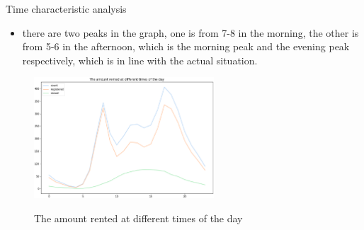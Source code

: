 \documentclass[
 size=14pt,
 paper=smartboard,  %
 mode=present, 		%
 display=slides, 	%
 style=tuliplab,  	%
 pauseslide,
 fleqn,leqno]{powerdot}
\begin{document}
\begin{slide}{Time characteristic analysis}

\begin{itemize}
\item
there are two peaks in the graph, one is from 7-8 in the morning, 
the other is from 5-6 in the afternoon, which is the morning peak 
and the evening peak respectively, which is in line with the actual situation. 
\end{itemize} 
\vspace{-0.8cm} 
\begin{figure}
  \centering
  \includegraphics[width=0.6\textwidth]{figures//Time_trends_day.eps}\\
  \caption{The amount rented at different times of the day} \label{framework}
\end{figure}


\end{slide}
\end{document}

